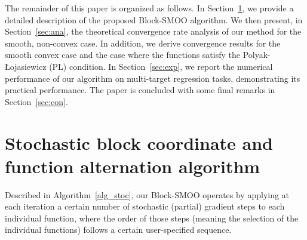 \documentclass[11pt,a4paper]{article}
\numberwithin{equation}{section}%
\renewcommand{\(}{\left (}
\renewcommand{\)}{\right )}
\begin{document}



The remainder of this paper is organized as follows. In Section~\ref{sec:alg}, we provide a detailed description of the proposed Block-SMOO algorithm. We then present, in Section~\ref{sec:ana}, the theoretical convergence rate analysis of our method for the smooth, non-convex case.  In addition, we derive convergence results for the smooth convex case and the case where the functions satisfy the Polyak-Łojasiewicz (PL) condition. In Section~\ref{sec:exp}, we report the numerical performance of our algorithm on multi-target regression tasks, demonstrating its practical performance. The paper is concluded with some final remarks in Section~\ref{sec:con}.


\section{Stochastic block coordinate and function alternation algorithm}\label{sec:alg}


Described in Algorithm~\ref{alg_stoc}, our Block-SMOO operates by applying at each iteration a certain number of stochastic (partial) gradient steps to each individual function, where the order of those steps (meaning the selection of the individual functions) follows a certain user-specified sequence. 
\end{document}

